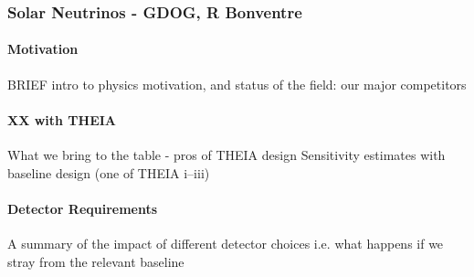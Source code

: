 \subsubsection{Solar Neutrinos - GDOG, R Bonventre}
\paragraph{Motivation}
BRIEF intro to physics motivation, and status of the field: our major competitors
\paragraph{XX with THEIA}
What we bring to the table - pros of THEIA design \newline
Sensitivity estimates with baseline design (one of THEIA i--iii)
\paragraph{Detector Requirements}
A summary of the impact of different detector choices i.e. what happens if we stray from the relevant baseline
